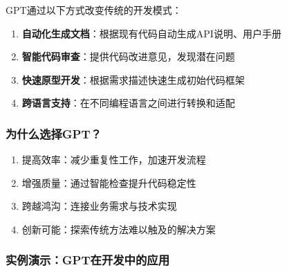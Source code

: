 GPT通过以下方式改变传统的开发模式：

\begin{enumerate}
\def\labelenumi{\arabic{enumi}.}
\item
  \textbf{自动化生成文档}：根据现有代码自动生成API说明、用户手册
\item
  \textbf{智能代码审查}：提供代码改进意见，发现潜在问题
\item
  \textbf{快速原型开发}：根据需求描述快速生成初始代码框架
\item
  \textbf{跨语言支持}：在不同编程语言之间进行转换和适配
\end{enumerate}

\hypertarget{ux4e3aux4ec0ux4e48ux9009ux62e9gpt}{%
\subsubsection{为什么选择GPT？}\label{ux4e3aux4ec0ux4e48ux9009ux62e9gpt}}

\begin{enumerate}
\def\labelenumi{\arabic{enumi}.}
\item
  提高效率：减少重复性工作，加速开发流程
\item
  增强质量：通过智能检查提升代码稳定性
\item
  跨越鸿沟：连接业务需求与技术实现
\item
  创新可能：探索传统方法难以触及的解决方案
\end{enumerate}

\hypertarget{ux5b9eux4f8bux6f14ux793agptux5728ux5f00ux53d1ux4e2dux7684ux5e94ux7528}{%
\subsubsection{实例演示：GPT在开发中的应用}\label{ux5b9eux4f8bux6f14ux793agptux5728ux5f00ux53d1ux4e2dux7684ux5e94ux7528}}


